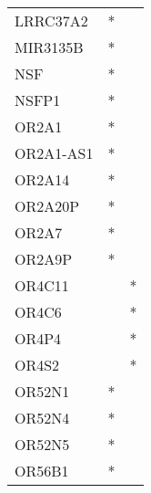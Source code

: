 \begin{tabular}{lcc}
LRRC37A2     &              * &            \\
MIR3135B     &              * &            \\
NSF          &              * &            \\
NSFP1        &              * &            \\
OR2A1        &              * &            \\
OR2A1-AS1    &              * &            \\
OR2A14       &              * &            \\
OR2A20P      &              * &            \\
OR2A7        &              * &            \\
OR2A9P       &              * &            \\
OR4C11       &                &          * \\
OR4C6        &                &          * \\
OR4P4        &                &          * \\
OR4S2        &                &          * \\
OR52N1       &              * &            \\
OR52N4       &              * &            \\
OR52N5       &              * &            \\
OR56B1       &              * &            \\
\bottomrule
\end{tabular}
